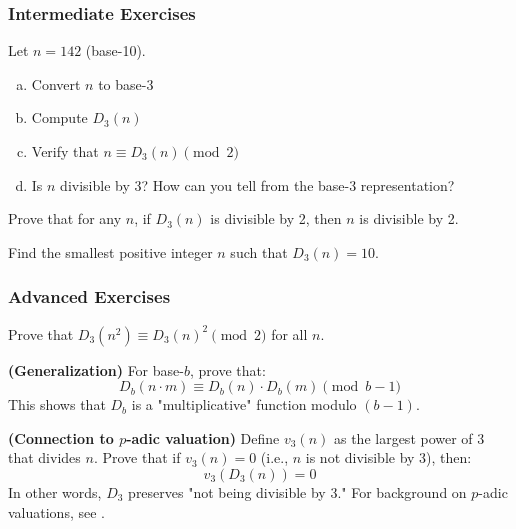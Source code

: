 \subsubsection*{Intermediate Exercises}

\begin{exercise}
Let $n = 142$ (base-10).
\begin{enumerate}[(a)]
\item Convert $n$ to base-3
\item Compute $D_3(n)$
\item Verify that $n \equiv D_3(n) \pmod{2}$
\item Is $n$ divisible by 3? How can you tell from the base-3 representation?
\end{enumerate}
\end{exercise}

\begin{exercise}
Prove that for any $n$, if $D_3(n)$ is divisible by 2, then $n$ is divisible by 2.
\end{exercise}

\begin{exercise}
Find the smallest positive integer $n$ such that $D_3(n) = 10$.
\end{exercise}

\subsubsection*{Advanced Exercises}

\begin{exercise}
Prove that $D_3(n^2) \equiv D_3(n)^2 \pmod{2}$ for all $n$.
\end{exercise}

\begin{exercise}
\textbf{(Generalization)} For base-$b$, prove that:
\begin{equation}
D_b(n \cdot m) \equiv D_b(n) \cdot D_b(m) \pmod{b-1}
\end{equation}
This shows that $D_b$ is a "multiplicative" function modulo $(b-1)$.
\end{exercise}

\begin{exercise}
\textbf{(Connection to $p$-adic valuation)} Define $v_3(n)$ as the largest power of 3 that divides $n$. Prove that if $v_3(n) = 0$ (i.e., $n$ is not divisible by 3), then:
\begin{equation}
v_3(D_3(n)) = 0
\end{equation}
In other words, $D_3$ preserves "not being divisible by 3." For background on $p$-adic valuations, see \cite{koblitz1984,gouvea1997}.
\end{exercise}

